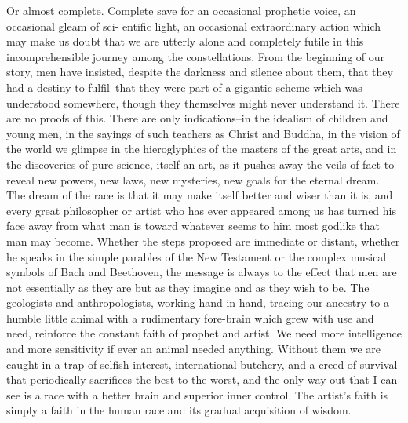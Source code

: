 \documentclass[9pt,twoside]{extarticle}
\begin{document}
Or almost complete. Complete save for an occasional prophetic voice, an occasional gleam of sci- entific light, an occasional extraordinary action which may make us doubt that we are utterly alone and completely futile in this incomprehensible journey among the constellations. From the beginning of our story, men have insisted, despite the darkness and silence about them, that they had a destiny to fulfil--that they were part of a gigantic scheme which was understood somewhere, though they themselves might never understand it. There are no proofs of this. There are only indications--in the idealism of children and young men, in the sayings of such teachers as Christ and Buddha, in the vision of the world we glimpse in the hieroglyphics of the masters of the great arts, and in the discoveries of pure science, itself an art, as it pushes away the veils of fact to reveal new powers, new laws, new mysteries, new goals for the eternal dream. The dream of the race is that it may make itself better and wiser than it is, and every great philosopher or artist who has ever appeared among us has turned his face away from what man is toward whatever seems to him most godlike that man may become. Whether the steps proposed are immediate or distant, whether he speaks in the simple parables of the New Testament or the complex musical symbols of Bach and Beethoven, the message is always to the effect that men are not essentially as they are but as they imagine and as they wish to be. The geologists and anthropologists, working hand in hand, tracing our ancestry to a humble little animal with a rudimentary fore-brain which grew with use and need, reinforce the constant faith of prophet and artist. We need more intelligence and more sensitivity if ever an animal needed anything. Without them we are caught in a trap of selfish interest, international butchery, and a creed of survival that periodically sacrifices the best to the worst, and the only way out that I can see is a race with a better brain and superior inner control. The artist's faith is simply a faith in the human race and its gradual acquisition of wisdom.
\end{document}
